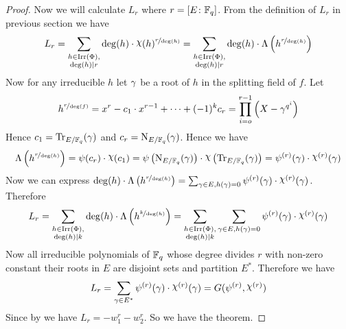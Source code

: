 \begin{proof}
  Now we will calculate $L_r$  where $r=[E\colon \mathbb{F}_q]$. From the definition of $L_r$ in previous section we have $$L_r =  \sum_{\substack{h\in\irr(\Phi),\\ \deg(h)\mid r}}\deg(h)\cdot \chi(h)^{\nicefrac{r}{\deg(h)}}= \sum_{\substack{h\in\irr(\Phi),\\ \deg(h)\mid r}} \deg(h)\cdot \Lambda\lt( h^{\nicefrac{r}{\deg(h)}}\rt)$$Now for any irreducible $h$ let $\gamma$ be a root of $h$ in the splitting field of $f$. Let $$h^{\nicefrac{r}{\deg(f)}}= x^r-c_1\cdot x^{r-1}+\cdots+(-1)^k c_r=\prod_{i=o}^{r-1}\left(X-\gamma^{q^i}\right)$$Hence 
  $c_1=\operatorname{Tr}_{E/\mathbb{F}_q}(\gamma)$ and $c_r=\operatorname{N}_{E/\mathbb{F}_q}(\gamma)$. Hence we have $$\Lambda\lt(h^{\nicefrac{r}{\deg(h)}}\rt)=\psi(c_r)\cdot \chi(c_1)=\psi\lt(\norm_{E/\bbF_q}(\gm)\rt)\cdot \chi\lt(\tr_{E/\bbF_q}(\gm)\rt)=\psi^{(r)}(\gm)\cdot \chi^{(r)}(\gm)$$Now we can express $\deg(h)\cdot \Lambda\lt(h^{\nicefrac{r}{\deg(h)}}\rt)=\sum_{\gm\in E,h(\gm)=0}\psi^{(r)}(\gm)\cdot \chi^{(r)}(\gm)$. 
  Therefore $$L_r= \sum_{\substack{h\in\irr(\Phi),\\ \deg(h)\mid k}} \deg(h)\cdot \Lambda\lt( h^{\nicefrac{k}{\deg(h)}}\rt)=\sum_{\substack{h\in\irr(\Phi),\\ \deg(h)\mid k}}\sum_{\gm\in E,h(\gm)=0}\psi^{(r)}(\gm)\cdot \chi^{(r)}(\gm) $$Now all irreducible polynomials of $\mathbb{F}_q$ whose degree divides $r$ with non-zero constant their roots in $E$ are disjoint sets and partition $E^*$. Therefore we have $$L_r=\sum_{\gm\in E^*}\psi^{(r)}(\gm)\cdot \chi^{(r)}(\gm)=G(\psi^{(r)},\chi^{(r)})$$Since  by \LrootFactthm we have $L_r=-w_1^r-w_2^r$. So we have the theorem. 
\end{proof}

